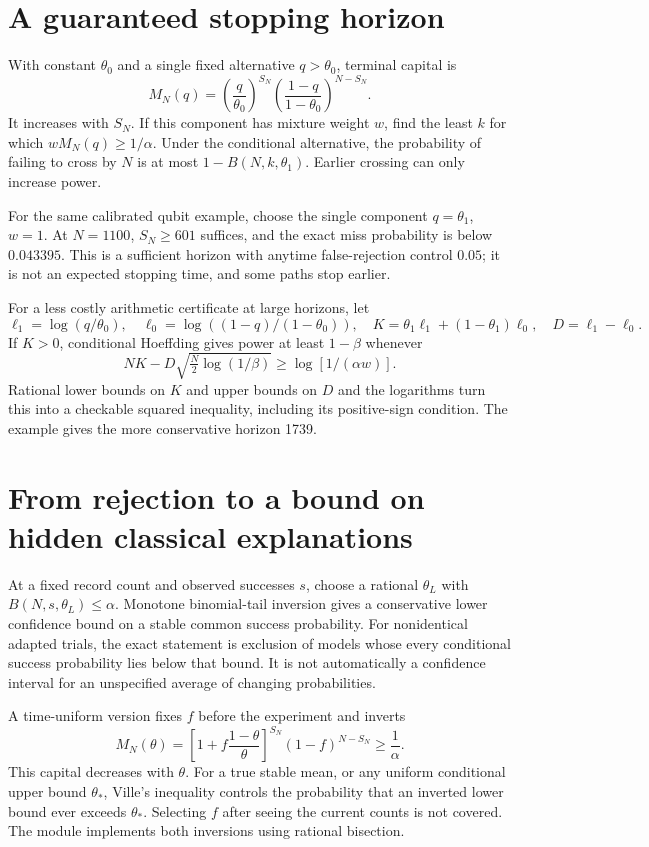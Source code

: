 \section{A guaranteed stopping horizon}
With constant $\theta_0$ and a single fixed alternative $q>\theta_0$,
terminal capital is
\[
 M_N(q)=\left(\frac q{\theta_0}\right)^{S_N}
        \left(\frac{1-q}{1-\theta_0}\right)^{N-S_N}.
\]
It increases with $S_N$. If this component has mixture weight $w$, find
the least $k$ for which $wM_N(q)\geq1/\alpha$. Under the conditional
alternative, the probability of failing to cross by $N$ is at most
$1-B(N,k,\theta_1)$. Earlier crossing can only increase power.

For the same calibrated qubit example, choose the single component
$q=\theta_1$, $w=1$. At $N=1100$, $S_N\geq601$ suffices, and the exact
miss probability is below $0.043395$. This is a sufficient horizon with
anytime false-rejection control $0.05$; it is not an expected stopping
time, and some paths stop earlier.

For a less costly arithmetic certificate at large horizons, let
\[
 \ell_1=\log(q/\theta_0),\quad
 \ell_0=\log((1-q)/(1-\theta_0)),\quad
 K=\theta_1\ell_1+(1-\theta_1)\ell_0,\quad D=\ell_1-\ell_0.
\]
If $K>0$, conditional Hoeffding gives power at least $1-\beta$ whenever
\[
 NK-D\sqrt{\tfrac N2\log(1/\beta)}\geq\log[1/(\alpha w)].
\]
Rational lower bounds on $K$ and upper bounds on $D$ and the logarithms
turn this into a checkable squared inequality, including its positive-sign
condition. The example gives the more conservative horizon 1739.

\section{From rejection to a bound on hidden classical explanations}
At a fixed record count and observed successes $s$, choose a rational
$\theta_L$ with $B(N,s,\theta_L)\leq\alpha$. Monotone binomial-tail
inversion gives a conservative lower confidence bound on a stable common
success probability. For nonidentical adapted trials, the exact statement
is exclusion of models whose every conditional success probability lies
below that bound. It is not automatically a confidence interval for an
unspecified average of changing probabilities.

A time-uniform version fixes $f$ before the experiment and inverts
\[
 M_N(\theta)=
 \left[1+f\frac{1-\theta}{\theta}\right]^{S_N}
 (1-f)^{N-S_N}\geq\frac1\alpha.
\]
This capital decreases with $\theta$. For a true stable mean, or any
uniform conditional upper bound $\theta_*$, Ville's inequality controls
the probability that an inverted lower bound ever exceeds $\theta_*$.
Selecting $f$ after seeing the current counts is not covered. The module
implements both inversions using rational bisection.

